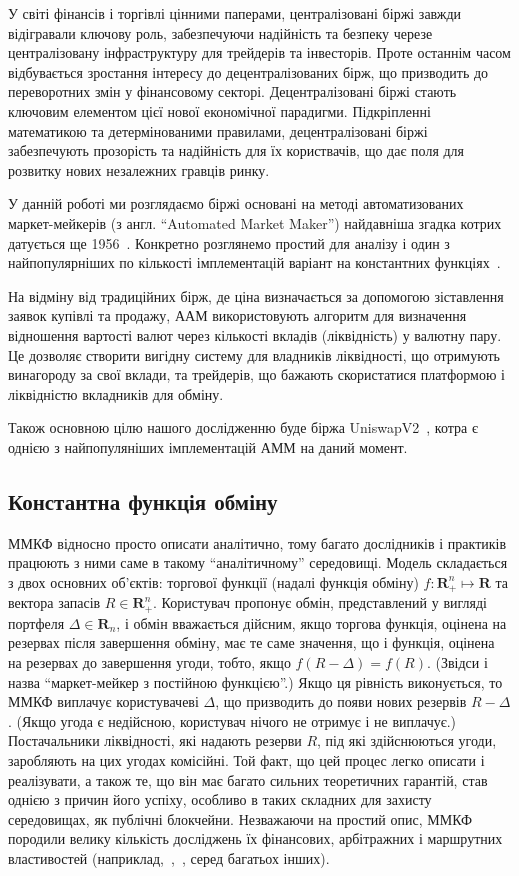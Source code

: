 \documentclass[../index.tex]{subfiles}
\begin{document}
У світі фінансів і торгівлі цінними паперами, централізовані біржі завжди
відігравали ключову роль, забезпечуючи надійність та безпеку черезе
централізовану інфраструктуру для трейдерів та інвесторів. Проте останнім часом
відбувається зростання інтересу до децентралізованих бірж, що призводить до
переворотних змін у фінансовому секторі. Децентралізовані біржі стають ключовим
елементом цієї нової економічної парадигми. Підкріпленні математикою та
детермінованими правилами, децентралізовані біржі забезпечують прозорість та
надійність для їх користвачів, що дає поля для розвитку нових незалежних гравців
ринку.

У данній роботі ми розглядаємо біржі основані на методі автоматизованих
маркет-мейкерів (з англ. ``Automated Market Maker'') найдавніша згадка котрих
датується ще 1956~\cite{mccarthy}. Конкретно розглянемо простий для аналізу і
один з найпопулярніших по кількості імплементацій варіант на константних
функціях~\cite{angeris_2023}.

На відміну від традиційних бірж, де ціна визначається за допомогою зіставлення
заявок купівлі та продажу, ААМ використовують алгоритм для визначення відношення
вартості валют через кількості вкладів (ліквідність) у валютну пару. Це дозволяє
створити вигідну систему для владників ліквідності, що отримують винагороду за
свої вклади, та трейдерів, що бажають скористатися платформою і ліквідністю
вкладників для обміну.

Також основною цілю нашого дослідженню буде біржа
UniswapV2~\cite{adams2021uniswap}, котра є однією з найпопуляніших імплементацій
АММ на даний момент.

\subsection{Константна функція обміну}\label{sec:math-model}

ММКФ відносно просто описати аналітично, тому багато дослідників і практиків
працюють з ними саме в такому ``аналітичному'' середовищі. Модель складається з
двох основних об'єктів: торгової функції (надалі функція обміну)
$f : \mathbf{R}_{+}^{n} \mapsto \mathbf{R}$ та вектора запасів
$R \in \mathbf{R}^{n}_{+}$. Користувач пропонує обмін, представлений у вигляді
портфеля $\Delta \in \mathbf{R}_{n}$, і обмін вважається дійсним, якщо торгова
функція, оцінена на резервах після завершення обміну, має те саме значення, що і
функція, оцінена на резервах до завершення угоди, тобто, якщо
$f(R - \Delta) = f(R)$. (Звідси і назва ``маркет-мейкер з постійною функцією''.)
Якщо ця рівність виконується, то ММКФ виплачує користувачеві $\Delta$, що
призводить до появи нових резервів $R - \Delta$. (Якщо угода є недійсною,
користувач нічого не отримує і не виплачує.) Постачальники ліквідності, які
надають резерви $R$, під які здійснюються угоди, заробляють на цих угодах
комісійні. Той факт, що цей процес легко описати і реалізувати, а також те, що
він має багато сильних теоретичних гарантій, став однією з причин його успіху,
особливо в таких складних для захисту середовищах, як публічні блокчейни.
Незважаючи на простий опис, ММКФ породили велику кількість досліджень їх
фінансових, арбітражних і маршрутних властивостей
(наприклад,~\cite{Angeris_2020},~\cite{danos}, серед багатьох інших).
\end{document}
